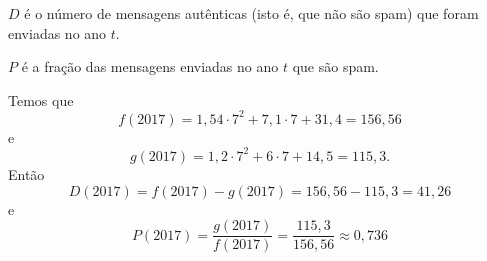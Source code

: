 $D$ é o número de mensagens autênticas (isto é, que não são spam) que foram enviadas no 
ano $t$.

$P$ é a fração das mensagens enviadas no ano $t$ que são spam.

Temos que
\[
	f(2017)=1,54\cdot7^2+7,1\cdot7+31,4=156,56
\]
e
\[
	g(2017)=1,2\cdot7^2+6\cdot7+14,5=115,3.
\]
Então
\[
	D(2017)=f(2017)-g(2017)=156,56-115,3=41,26
\]
e
\[
	P(2017)=\frac{g(2017)}{f(2017)}=\frac{115,3}{156,56}\approx 0,736
\]
